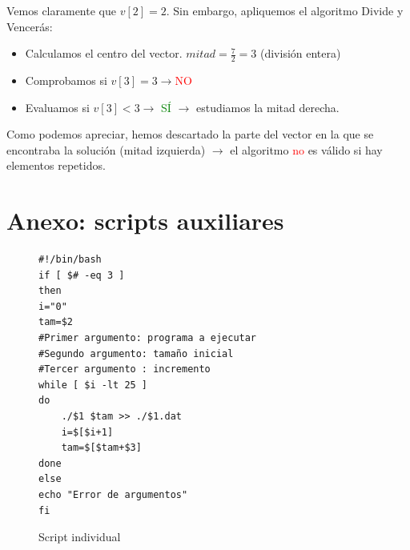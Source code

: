 \documentclass[12pt,spanish]{article}
\begin{document}
Vemos claramente que $v[2]=2$. Sin embargo, apliquemos el algoritmo Divide y Vencerás:
\begin{itemize}
\item Calculamos el centro del vector. $mitad=\frac{7}{2}=3$ (división entera)
\item Comprobamos si $v[3]=3 \rightarrow $\textcolor{red}{NO}
\item Evaluamos si $v[3]<3 \rightarrow$ \textcolor{green}{SÍ} $\rightarrow$ estudiamos la mitad derecha.
\end{itemize}
\begin{figure}[H]
\centering
{}
\end{figure}

Como podemos apreciar, hemos descartado la parte del vector en la que se encontraba la solución (mitad izquierda) $\rightarrow$ el algoritmo \textcolor{red}{no} es válido si hay elementos repetidos.
\newpage

\section{Anexo: scripts auxiliares}
\label{sec:scripts}

\begin{figure}[H]
\begin{verbatim}
#!/bin/bash
if [ $# -eq 3 ]
then
i="0"
tam=$2
#Primer argumento: programa a ejecutar
#Segundo argumento: tamaño inicial
#Tercer argumento : incremento
while [ $i -lt 25 ]
do
	./$1 $tam >> ./$1.dat
	i=$[$i+1]
	tam=$[$tam+$3]
done
else
echo "Error de argumentos"
fi

\end{verbatim}
\caption{Script individual}
\end{figure}
\end{document}
